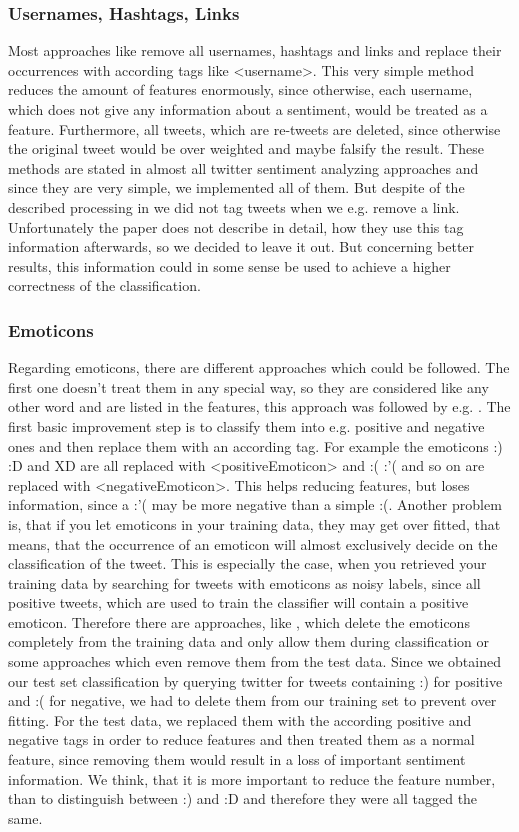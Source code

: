 \documentclass{sig-alternate}
\begin{document}
\subsubsection{Usernames, Hashtags, Links}
Most approaches like \cite{go2009twitter} remove all usernames, hashtags and links and replace their occurrences with according tags like <username>. This very simple method reduces the amount of features enormously, since otherwise, each username, which does not give any information about a sentiment, would be treated as a feature. Furthermore, all tweets, which are re-tweets are deleted, since otherwise the original tweet would be over weighted and maybe falsify the result. These methods are stated in almost all twitter sentiment analyzing approaches and since they are very simple, we implemented all of them. But despite of the described processing in \cite{kouloumpis2011twitter} we did not tag tweets when we e.g. remove a link. Unfortunately the paper does not describe in detail, how they use this tag information afterwards, so we decided to leave it out. But concerning better results, this information could in some sense be used to achieve a higher correctness of the classification.

\subsubsection{Emoticons}
Regarding emoticons, there are different approaches which could be followed. The first one doesn't treat them in any special way, so they are considered like any other word and are listed in the features, this approach was followed by e.g. \cite{JayantTwitter}. The first basic improvement step is to classify them into e.g. positive and negative ones and then replace them with an according tag. For example the emoticons :) :D and XD are all replaced with <positiveEmoticon> and :( :'( and so on are replaced with <negativeEmoticon>. This helps reducing features, but loses information, since a :'( may be more negative than a simple :(. Another problem is, that if you let emoticons in your training data, they may get over fitted, that means, that the occurrence of an emoticon will almost exclusively decide on the classification of the tweet. This is especially the case, when you retrieved your training data by searching for tweets with emoticons as noisy labels, since all positive tweets, which are used to train the classifier will contain a positive emoticon. Therefore there are approaches, like \cite{go2009twitter}, which delete the emoticons completely from the training data and only allow them during classification or some approaches which even remove them from the test data. Since we obtained our test set classification by querying twitter for tweets containing :) for positive and :( for negative, we had to delete them from our training set to prevent over fitting. For the test data, we replaced them with the according positive and negative tags in order to reduce features and then treated them as a normal feature, since removing them would result in a loss of important sentiment information. We think, that it is more important to reduce the feature number, than to distinguish between :) and :D and therefore they were all tagged the same.
\end{document}
